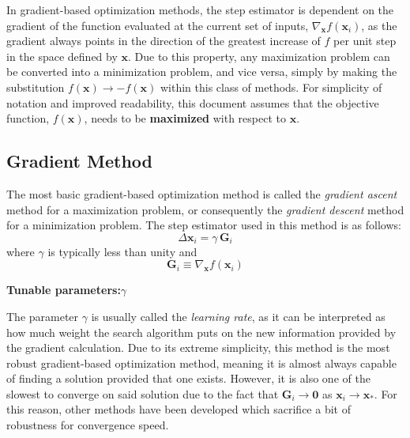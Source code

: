 \documentclass{article}
\begin{document}
In gradient-based optimization methods, the step estimator is dependent on the gradient of the function evaluated at the current set of inputs, $\nabla_{\mathbf{x}} f\!\left(\mathbf{x}_i\right)$, as the gradient always points in the direction of the greatest increase of $f$ per unit step in the space defined by $\mathbf{x}$. Due to this property, any maximization problem can be converted into a minimization problem, and vice versa, simply by making the substitution $f\!\left(\mathbf{x}\right) \rightarrow -f\!\left(\mathbf{x}\right)$ within this class of methods. For simplicity of notation and improved readability, this document assumes that the objective function, $f\!\left(\mathbf{x}\right)$, needs to be \textbf{maximized} with respect to $\mathbf{x}$.

\subsection{Gradient Method}
\label{subsec:Grad}

The most basic gradient-based optimization method is called the \emph{gradient ascent} method for a maximization problem, or consequently the \emph{gradient descent} method for a minimization problem. The step estimator used in this method is as follows:
\begin{equation}
\label{eq:SE_Grad}
	\Delta \mathbf{x}_i = \gamma \, \mathbf{G}_i
\end{equation}
where $\gamma$ is typically less than unity and
\begin{equation}
\label{eq:GradientVector}
	\mathbf{G}_i \equiv \nabla_{\mathbf{x}} f\!\left(\mathbf{x}_i\right)
\end{equation}

\begin{center}
	\textbf{Tunable parameters:}\hspace{20pt}$\gamma$
\end{center}

The parameter $\gamma$ is usually called the \emph{learning rate}, as it can be interpreted as how much weight the search algorithm puts on the new information provided by the gradient calculation. Due to its extreme simplicity, this method is the most robust gradient-based optimization method, meaning it is almost always capable of finding a solution provided that one exists. However, it is also one of the slowest to converge on said solution due to the fact that $\mathbf{G}_i \rightarrow \mathbf{0}$ as $\mathbf{x}_i \rightarrow \mathbf{x_*}$. For this reason, other methods have been developed which sacrifice a bit of robustness for convergence speed.
\end{document}
